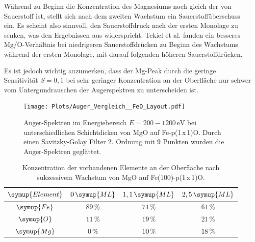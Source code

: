 Während zu Beginn die Konzentration des Magnesiums noch gleich der von Sauerstoff ist, stellt sich nach dem zweiten Wachstum ein 
Sauerstoffüberschuss ein. Es scheint also sinnvoll, den Sauerstoffdruck nach der ersten Monolage zu senken, was den Ergebnissen aus \cite{tekiel2013reactive} widerspricht.
Tekiel et al. fanden ein besseres Mg/O-Verhältnis bei niedrigeren Sauerstoffdrücken zu Beginn des Wachstums während der 
ersten Monolage, mit darauf folgenden höheren Sauerstoffdrücken.

Es ist jedoch wichtig anzumerken, dass der Mg-Peak durch die geringe Sensitivität $S=0,1$ bei sehr geringer Konzentration an
der Oberfläche nur schwer vom Untergundrauschen der Augerspektren zu unterscheiden ist. 

\begin{figure}
  \centering
  \texttt{[image: Plots/Auger\_Vergleich\_\_FeO\_Layout.pdf]}
  \caption{Auger-Spektren im Energiebereich $E=200-1200\, \si{\eV}$ bei unterschiedlichen Schichtdicken von MgO auf Fe-p(1\,x\,1)O. 
          Durch einen Savitzky-Golay Filter 2. Ordnung mit 9 Punkten wurden die
          Auger-Spektren geglättet.}
  \label{fig:Auger2}
\end{figure}



\begin{table}[H]
  \centering
  \begin{tabular}{S| S S S}
    \toprule
    {$\symup{Element}$} & {$0\,\symup{ML}$} & {$1,1\,\symup{ML}$} & {$2,5\,\symup{ML}$}\\
    \midrule
    $\symup{Fe}$ & {$89\,\si{\percent}$} & {$71\,\si{\percent}$} & {$61\,\si{\percent}$}\\
    $\symup{O}$ & {$11\,\si{\percent}$} & {$19\,\si{\percent}$} & {$21\,\si{\percent}$}\\
    $\symup{Mg}$ & {$0\,\si{\percent}$}& {$10\,\si{\percent}$}& {$18\,\si{\percent}$}\\
    \bottomrule
  \end{tabular}
  \caption{Konzentration der vorhandenen Elemente an der Oberfläche nach sukzessivem Wachstum von MgO auf Fe(100)-p(1\,x\,1)O.}
  \label{tab:AugerT2}
\end{table}

